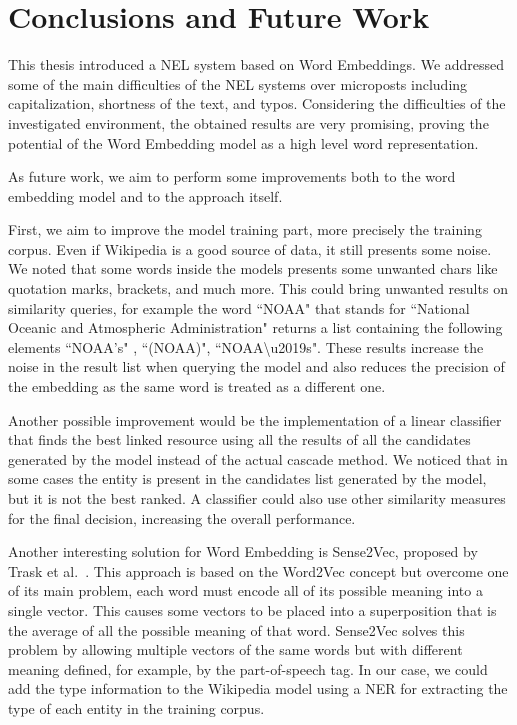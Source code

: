 \chapter{Conclusions and Future Work}


This thesis introduced a NEL system based on Word Embeddings. We addressed some of the main difficulties of the NEL systems over microposts including capitalization, shortness of the text, and typos. Considering the difficulties of the investigated environment, the obtained results are very promising, proving the potential of the Word Embedding model as a high level word representation.

As future work, we aim to perform some improvements both to the word embedding model and to the approach itself.


First, we aim to improve the model training part, more precisely the training corpus. Even if Wikipedia is a good source of data, it still presents some noise. We noted that some words inside the models presents some unwanted chars like quotation marks, brackets, and much more. This could bring unwanted results on similarity queries, for example the word ``NOAA"  that stands for ``National Oceanic and Atmospheric Administration" returns a list containing the following elements ``NOAA's" , ``(NOAA)",  \mbox{``NOAA\textbackslash u2019s"}. These results increase the noise in the result list when querying the model and also reduces the precision of the embedding as the same word is treated as a different one.


Another possible improvement would be the implementation of a linear classifier that finds the best linked resource using all the results of all the candidates generated by the model instead of the actual cascade method. We noticed that in some cases the entity is present in the candidates list generated by the model, but it is not the best ranked. A classifier could also use other similarity measures for the final decision, increasing the overall performance.


Another interesting solution for Word Embedding is Sense2Vec, proposed by Trask et al.~\cite{trask2015sense2vec}. This approach is based on the Word2Vec concept but overcome one of its main problem, each word must encode all of its possible meaning into a single vector. This causes some vectors to be placed into a superposition that is the average of all the possible meaning of that word. Sense2Vec solves this problem by allowing multiple vectors of the same words but with different meaning defined, for example, by the part-of-speech tag. In our case, we could add the type information to the Wikipedia model using a NER for extracting the type of each entity in the training corpus.

